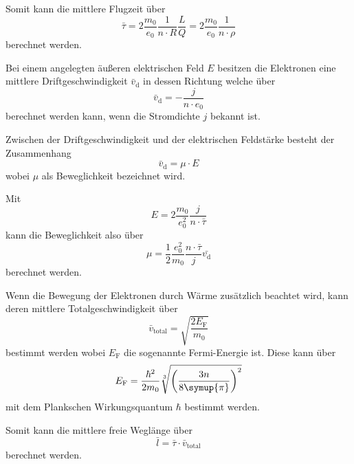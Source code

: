 Somit kann die mittlere Flugzeit über 
\begin{equation}
    \bar{\tau} = 2\frac{m_0}{e_0}\frac{1}{n \cdot R}\frac{L}{Q} = 2\frac{m_0}{e_0}\frac{1}{n \cdot \rho}
    \label{eq:tau}
\end{equation}
berechnet werden. \cite{V311}

Bei einem angelegten äußeren elektrischen Feld $E$ besitzen die Elektronen eine mittlere Driftgeschwindigkeit $\bar{v}_\text{d}$ in dessen Richtung welche über 
\begin{equation}
    \bar{v}_\text{d} = -\frac{j}{n \cdot e_0}
    \label{eq:driftgeschwindigkeit}
\end{equation}
berechnet werden kann, wenn die Stromdichte $j$ bekannt ist. \cite{V311}

Zwischen der Driftgeschwindigkeit und der elektrischen Feldstärke besteht der Zusammenhang
\begin{equation}
    \bar{v}_\text{d} = \mu \cdot E
\end{equation}
wobei $\mu$ als Beweglichkeit bezeichnet wird. \cite{V311}

Mit 
\begin{equation}
    E = 2 \frac{m_0}{e_0^2}\frac{j}{n\cdot\bar{\tau}}
\end{equation}
kann die Beweglichkeit also über
\begin{equation}
    \mu = \frac{1}{2}\frac{e_0^2}{m_0}\frac{n\cdot\bar{\tau}}{j} \bar{v_\text{d}}
    \label{eq:beweglichkeit}
\end{equation}
berechnet werden.

Wenn die Bewegung der Elektronen durch Wärme zusätzlich beachtet wird, kann deren mittlere Totalgeschwindigkeit über
\begin{equation}
    \bar{v}_\text{total} = \sqrt{\frac{2 E_\text{F}}{m_0}}
    \label{eq:totalgeschwindigkeit}
\end{equation}
bestimmt werden wobei $E_\text{F}$ die sogenannte Fermi-Energie ist.
Diese kann über 
\begin{equation}
    E_\text{F} = \frac{\hbar^2}{2 m_0}\sqrt[3]{\left(\frac{3n}{8\symup{\pi}}\right)^2}
    \label{eq:fermienergie}
\end{equation}
mit dem Plankschen Wirkungsquantum $\hbar$ bestimmt werden. \cite{V311}

Somit kann die mittlere freie Weglänge über
\begin{equation}
    \bar{l} = \bar{\tau} \cdot \bar{v}_\text{total}
    \label{eq:weglaenge}
\end{equation}
berechnet werden.

